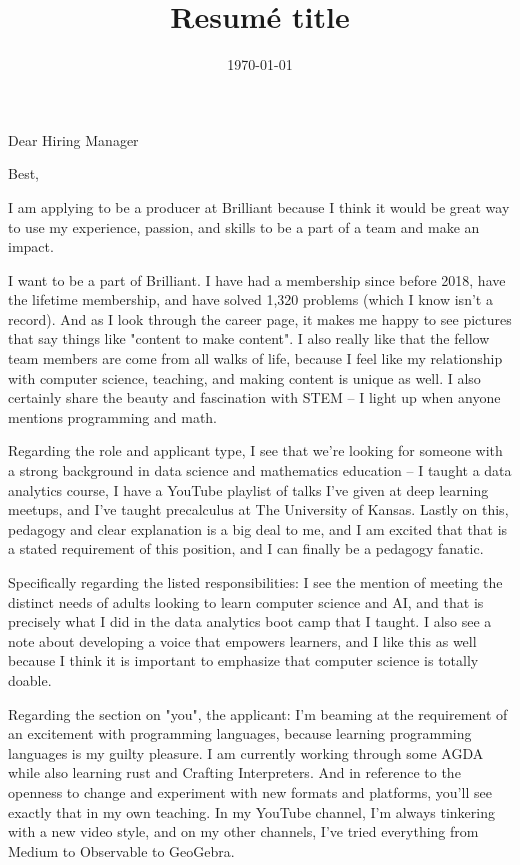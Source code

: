 \documentclass[11pt,a4paper,sans]{moderncv}        %
\title{Resumé title}
\begin{document}
\newcommand{\hiringmanager}{Hiring Manager}
\newcommand{\position}{Senior Producer (Programming, Computer Science, & Technology)}
\newcommand{\company}{Brilliant}

\recipient{\hiringmanager{}}{Brilliant}
\date{\today}
\opening{Dear \hiringmanager{}}
\closing{Best,}
\makelettertitle

I am applying to be a producer at Brilliant because
I think it would be great way to use my experience,
passion, and skills to be a part of a team and make
an impact.

I want to be a part of
Brilliant.  I have had a membership since before 2018, have the
lifetime membership, and have solved 1,320 problems (which I
know isn't a record).  And as I look through the career page,
it makes me happy to see pictures that say things like
"content to make content".  I also really like that
the fellow team members are come from all walks of life,
because I feel like my relationship with computer science,
teaching, and making content is unique as well. 
I also certainly share the
beauty and fascination with STEM -- I light
up when anyone mentions programming and math.

Regarding the role and applicant type, I see that we're
looking for someone with a strong background in data
science and mathematics education -- I taught a data
analytics course, I have a YouTube playlist of talks
I've given at deep learning meetups, and I've taught
precalculus at The University of Kansas.  Lastly on this,
pedagogy and clear explanation is a big deal to me, and
I am excited that that is a stated requirement of this
position, and I can finally be a pedagogy fanatic.

Specifically regarding the listed responsibilities:
I see the mention of meeting the distinct needs of adults
looking to learn computer science and AI, and that
is precisely what I did in the data analytics boot camp
that I taught.  I also see a note about developing
a voice that empowers learners, and I like this as well
because I think it is important to emphasize that computer
science is totally doable.

Regarding the section on "you", the applicant: I'm
beaming at the requirement of an excitement
with programming languages, because
learning programming languages is my
guilty pleasure. I am currently working through some
AGDA while also learning rust and Crafting Interpreters.
And in reference to the openness to change and experiment
with new formats and platforms, you'll see exactly that
in my own teaching. In my YouTube channel, I'm always
tinkering with a new video style, and on my other channels,
I've tried everything from Medium to Observable to GeoGebra.
\end{document}
